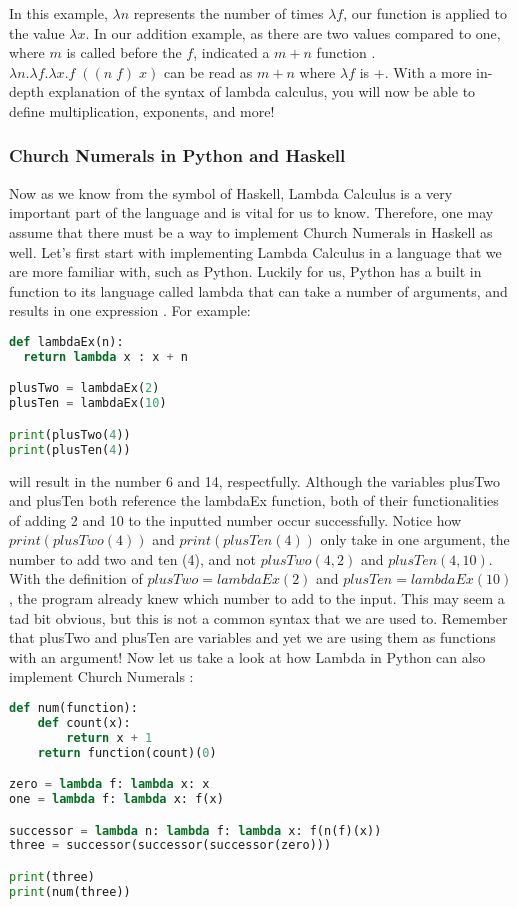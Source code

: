 \documentclass{article}
\begin{document}
\noindent
In this example, $\lambda n$ represents the number of times $\lambda f$, our function is applied to the value $\lambda x$. In our addition example, as there are two values compared to one, where $m$ is called before the $f$, indicated a $m+n$ function \cite{CE}. $\lambda n. \lambda f. \lambda x.f \; ((n \; f) \; x)$ can be read as $m + n$ where $\lambda f$ is +. With a more in-depth explanation of the syntax of lambda calculus, you will now be able to define multiplication, exponents, and more!

\subsubsection{Church Numerals in Python and Haskell}
Now as we know from the symbol of Haskell, Lambda Calculus is a very important part of the language and is vital for us to know. Therefore, one may assume that there must be a way to implement Church Numerals in Haskell as well. Let's first start with implementing Lambda Calculus in a language that we are more familiar with, such as Python. Luckily for us, Python has a built in function to its language called lambda that can take a number of arguments, and results in one expression \cite{LCP}. For example:
\begin{lstlisting}[language=Python]
def lambdaEx(n):
  return lambda x : x + n

plusTwo = lambdaEx(2)
plusTen = lambdaEx(10)

print(plusTwo(4)) 
print(plusTen(4)) 
\end{lstlisting}

\noindent
will result in the number 6 and 14, respectfully. Although the variables plusTwo and plusTen both reference the lambdaEx function, both of their functionalities of adding 2 and 10 to the inputted number occur successfully. Notice how $print(plusTwo(4))$ and $print(plusTen(4))$ only take in one argument, the number to add two and ten (4), and not $plusTwo(4, 2)$ and $plusTen(4, 10)$. With the definition of $plusTwo = lambdaEx(2)$ and $plusTen = lambdaEx(10)$, the program already knew which number to add to the input. This may seem a tad bit obvious, but this is not a common syntax that we are used to. Remember that plusTwo and plusTen are variables and yet we are using them as functions with an argument! Now let us take a look at how Lambda in Python can also implement Church Numerals \cite{LCP}:

\begin{lstlisting}[language=Python]
def num(function):
    def count(x):
        return x + 1
    return function(count)(0)

zero = lambda f: lambda x: x
one = lambda f: lambda x: f(x)

successor = lambda n: lambda f: lambda x: f(n(f)(x))
three = successor(successor(successor(zero)))

print(three)
print(num(three))
\end{lstlisting}
\end{document}

